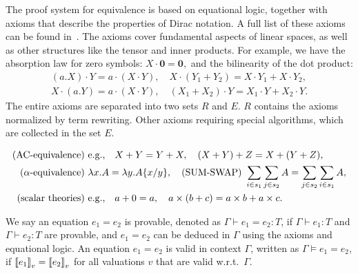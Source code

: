 The proof system for equivalence is based on equational logic, together with axioms that describe the properties of Dirac notation. A full list of these axioms can be found in~. The axioms cover fundamental aspects of linear spaces, as well as other structures like the tensor and inner products. For example, we have the absorption law for zero symbols:
\(X \cdot \mathbf{0} = \mathbf{0},\)
and the bilinearity of the dot product:
\begin{align*}
(a.X) \cdot Y = a \cdot (X \cdot Y), \quad X \cdot (Y_1 + Y_2) = X \cdot Y_1 + X \cdot Y_2, \\
X \cdot (a.Y) = a \cdot (X \cdot Y), \quad (X_1 + X_2) \cdot Y = X_1 \cdot Y + X_2 \cdot Y.
\end{align*}
The entire axioms are separated into two sets $R$ and $E$.
$R$ contains the axioms normalized by term rewriting. Other axioms requiring special algorithms, which are collected in the set $E$.
\begin{definition}
\label{def: axiom E}
\begin{align*}
    \textup{(AC-equivalence)} &\ \text{e.g.,} \quad X + Y = Y + X, \quad (X + Y) + Z = X + (Y + Z), \\
    \textup{($\alpha$-equivalence)} &\ \lambda x . A = \lambda y . A\{x/y\},
    \quad
    \textup{(SUM-SWAP)} \ \sum_{i \in s_1} \sum_{j \in s_2} A = \sum_{j \in s_2} \sum_{i \in s_1} A, \\
    \textup{(scalar theories)} &\ \text{e.g.,} \quad a + 0 = a, \quad a \times (b + c) = a \times b + a \times c.
\end{align*}
\end{definition}



We say an equation $e_1 = e_2$ is provable, denoted as $\Gamma \vdash e_1 = e_2 : T$, if $\Gamma \vdash e_1 : T$ and $\Gamma \vdash e_2 : T$ are provable, and $e_1 = e_2$ can be deduced in $\Gamma$ using the axioms and equational logic.
An equation \( e_1 = e_2 \) is valid in context $\Gamma$, written as \(
\Gamma \vDash e_1 = e_2 \), if \( {\llbracket e_1 \rrbracket}_v = {\llbracket e_2 \rrbracket}_v \) for
all valuations \( v \) that are valid w.r.t.\, \( \Gamma \).

